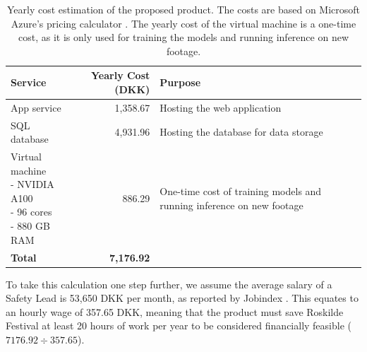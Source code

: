 \begin{table}[htb!]
  \centering
  \renewcommand{\arraystretch}{1.2}
  \begin{tabularx}{0.9\textwidth}{@{} l r X @{}}
    \toprule
    Service        & Yearly Cost (DKK) & Purpose                               \\
    \midrule
    App service    & 1,358.67          & Hosting the web application           \\
    SQL database   & 4,931.96          & Hosting the database for data storage \\
    \makecell[l]{Virtual machine                                               \\ {\scriptsize - NVIDIA A100} \\ {\scriptsize - 96 cores} \\ {\scriptsize - 880 GB RAM}} & 886.29 & One-time cost of training models and running inference on new footage \\
    \midrule
    \textbf{Total} & \textbf{7,176.92} &                                       \\
    \bottomrule
  \end{tabularx}
  \caption{Yearly cost estimation of the proposed product. The costs are based on Microsoft Azure's pricing calculator \cite{azure_pricing}. The yearly cost of the virtual machine is a one-time cost, as it is only used for training the models and running inference on new footage.}
  \label{tab:costs_estimation}
  \renewcommand{\arraystretch}{1.0}
\end{table}

To take this calculation one step further, we assume the average salary of a Safety Lead is 53,650 DKK per month, as reported by Jobindex \cite{jobindex}. This equates to an hourly wage of 357.65 DKK, meaning that the product must save Roskilde Festival at least 20 hours of work per year to be considered financially feasible ($7176.92 \div 357.65$).


